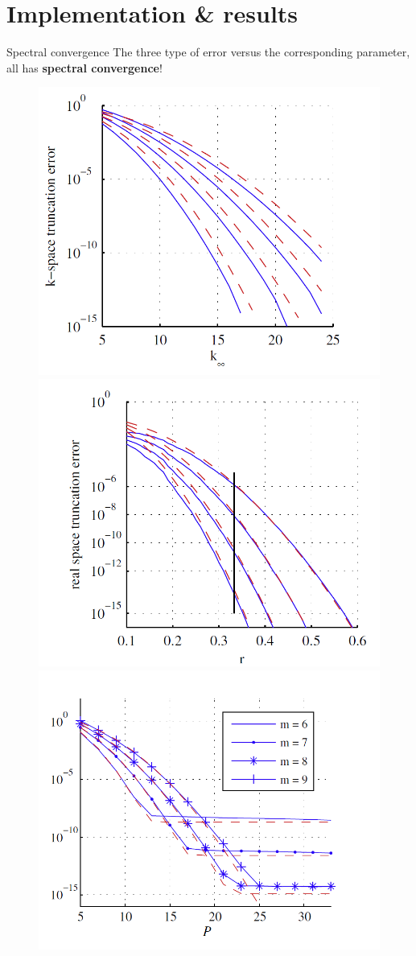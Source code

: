 \documentclass{beamer}
\begin{document}
\section{Implementation \& results}

\begin{frame}{Spectral convergence}
The three type of error versus the corresponding parameter, \\
all has \textbf{spectral convergence}!
\begin{figure}[H]\centering
	\includegraphics[width=.36\textwidth]{freq_error_vs_k}
	\includegraphics[width=.36\textwidth]{real_error_vs_r}
	\includegraphics[width=.36\textwidth]{qudrature_error_vs_P}
\end{figure}
\end{frame}
\end{document}
